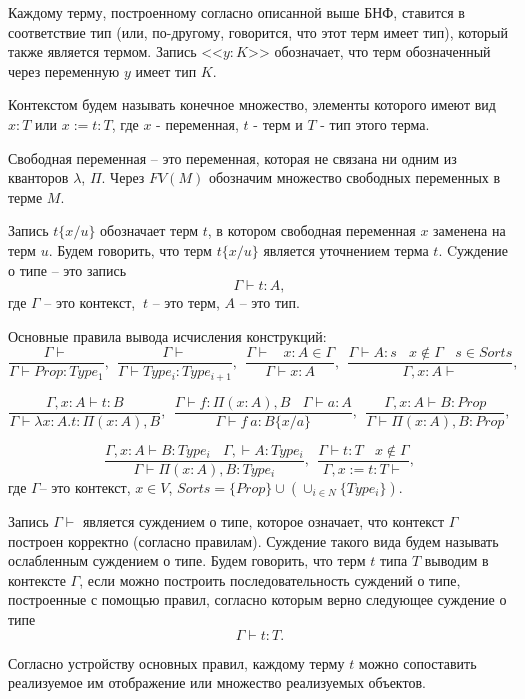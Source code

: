 \documentclass[12pt]{article}
\begin{document}
Каждому терму, построенному согласно описанной выше БНФ, 
ставится в соответствие тип (или, по-другому, говорится, что этот терм имеет тип), который также является термом.
Запись <<$y:K$>> обозначает, что терм обозначенный через переменную $y$ имеет тип $K$.

Контекстом будем называть конечное множество, элементы которого имеют вид $x : T$ или $x := t : T$, где $x$ - переменная, $t$ - терм и $T$ - тип этого терма.

Свободная переменная -- это переменная, которая не связана ни одним из кванторов $\lambda$, $\Pi$. Через $FV(M)$ обозначим множество свободных переменных в терме $M$.

Запись $t\{x/u\}$ обозначает терм $t$, в котором свободная переменная $x$ заменена на терм $u$. Будем говорить, что терм $t\{x/u\}$ является уточнением терма $t$. Cуждение о типе -- это запись 
$$\Gamma \vdash t: A,$$ 
где $\Gamma$ -- это контекст, $\ t$ -- это терм,  $A$ -- это тип. 

Основные правила вывода исчисления конструкций:
$$\frac{\Gamma \vdash }
        {\Gamma \vdash Prop: Type_1}, \ \  
\frac{\Gamma \vdash }
    {\Gamma \vdash Type_i: Type_{i+1}}, \ \ 
\frac{\Gamma \vdash \ \ \ \ x:A \in \Gamma}
        {\Gamma \vdash x:A},\ \ 
\frac{\Gamma \vdash A:s \ \ \ \ x \notin \Gamma \ \ \ \  s\in Sorts}
{\Gamma, x:A \vdash },$$
        
$$\frac{\Gamma, x:A \vdash t:B}
        {\Gamma \vdash \lambda x:A.t:\Pi (x:A), B},\ \ 
    \frac{\Gamma \vdash f:\Pi (x:A), B \ \ \ \  \Gamma \vdash a: A}
        {\Gamma \vdash f\ a:B\{x/a\}},\ \ 
        \frac{\Gamma, x:A \vdash B:Prop} 
        {\Gamma \vdash \Pi (x:A), B:Prop},$$

$$\frac{\Gamma, x:A \vdash B:Type_i \ \ \ \  \Gamma, \vdash A:Type_i}
        {\Gamma \vdash \Pi (x:A), B:Type_i},\ \ 
    \frac{\Gamma \vdash t: T \ \ \ \ x \notin \Gamma}
        {\Gamma, x:=t:T \vdash },$$
где  $\Gamma$-- это контекст, $x \in V$, $Sorts=\{Prop\} \cup (\cup_{i \in N} \{Type_i\}).$

Запись $\Gamma \vdash$ является суждением о типе, которое означает, что контекст $\Gamma$ построен корректно (согласно правилам). Суждение такого вида будем называть ослабленным суждением о типе.
Будем говорить, что терм $t$ типа $T$ выводим в контексте $\Gamma$, если можно построить последовательность суждений о типе, построенные с помощью правил, согласно которым верно следующее суждение о типе
$$\Gamma \vdash t: T.$$

Согласно устройству основных правил, каждому терму $t$ можно сопоставить реализуемое им отображение или множество реализуемых объектов.
\end{document}
